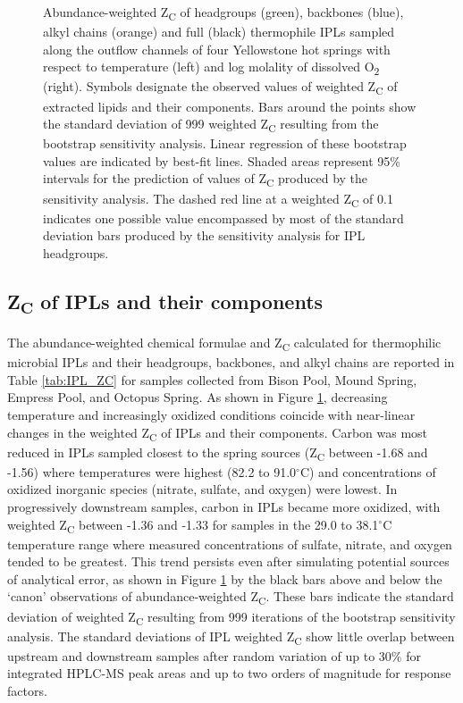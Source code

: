 {\begin{figure}[h]
\begin{subfigure}[b]{0.18\linewidth}
    \end{subfigure}
\caption[Abundance-weighted Z\textsubscript{C} of IPLs and their component parts]{Abundance-weighted Z\textsubscript{C} of headgroups (green), backbones (blue), alkyl chains (orange) and full (black) thermophile IPLs sampled along the outflow channels of four Yellowstone hot springs with respect to temperature (left) and log molality of dissolved O\textsubscript{2} (right). Symbols designate the observed values of weighted Z\textsubscript{C} of extracted lipids and their components. Bars around the points show the standard deviation of 999 weighted Z\textsubscript{C} resulting from the bootstrap sensitivity analysis. Linear regression of these bootstrap values are indicated by best-fit lines. Shaded areas represent 95\% intervals for the prediction of values of Z\textsubscript{C} produced by the sensitivity analysis. The dashed red line at a weighted Z\textsubscript{C} of 0.1 indicates one possible value encompassed by most of the standard deviation bars produced by the sensitivity analysis for IPL headgroups.}
\label{fig:weighted_ZC}
\end{figure}
\doublespace
\clearpage
}

\subsection{Z\textsubscript{C} of IPLs and their components}

The abundance-weighted chemical formulae and Z\textsubscript{C} calculated for thermophilic microbial IPLs and their headgroups, backbones, and alkyl chains are reported in Table \ref{tab:IPL_ZC} for samples collected from Bison Pool, Mound Spring, Empress Pool, and Octopus Spring. As shown in Figure \ref{fig:weighted_ZC}, decreasing temperature and increasingly oxidized conditions coincide with near-linear changes in the weighted Z\textsubscript{C} of IPLs and their components. Carbon was most reduced in IPLs sampled closest to the spring sources (Z\textsubscript{C} between -1.68 and -1.56) where temperatures were highest (82.2 to 91.0$^\circ$C) and concentrations of oxidized inorganic species (nitrate, sulfate, and oxygen) were lowest. In progressively downstream samples, carbon in IPLs became more oxidized, with weighted Z\textsubscript{C} between -1.36 and -1.33 for samples in the 29.0 to 38.1$^\circ$C temperature range where measured concentrations of sulfate, nitrate, and oxygen tended to be greatest. This trend persists even after simulating potential sources of analytical error, as shown in Figure \ref{fig:weighted_ZC} by the black bars above and below the `canon' observations of abundance-weighted Z\textsubscript{C}. These bars indicate the standard deviation of weighted Z\textsubscript{C} resulting from 999 iterations of the bootstrap sensitivity analysis. The standard deviations of IPL weighted Z\textsubscript{C} show little overlap between upstream and downstream samples after random variation of up to 30\% for integrated HPLC-MS peak areas and up to two orders of magnitude for response factors.

